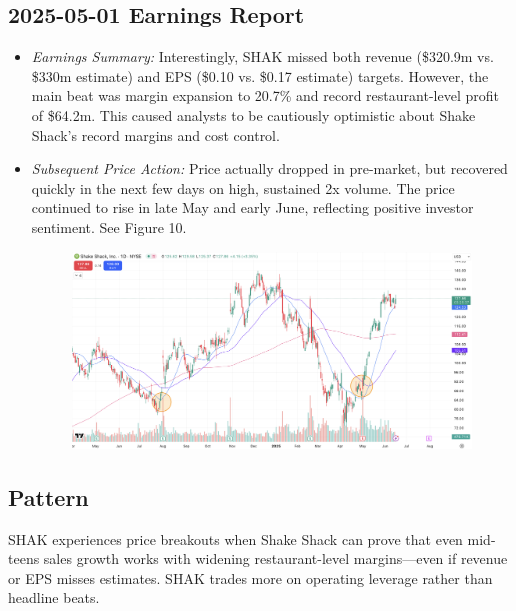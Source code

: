 \documentclass[11pt]{article}
\begin{document}
    \subsection{2025-05-01 Earnings Report}
        \begin{itemize}
            \item \textit{Earnings Summary:} Interestingly, SHAK missed both revenue (\$320.9m vs. \$330m estimate) and EPS (\$0.10 vs. \$0.17 estimate) targets. However, the main beat was margin expansion to 20.7\% and record restaurant-level profit of \$64.2m. This caused analysts to be cautiously optimistic about Shake Shack's record margins and cost control. 
            \item \textit{Subsequent Price Action:} Price actually dropped in pre-market, but recovered quickly in the next few days on high, sustained 2x volume. The price continued to rise in late May and early June, reflecting positive investor sentiment. See Figure 10.
            \begin{figure}[h]
                \centering \includegraphics[width=0.8\linewidth]{images/SHAK2.png}
                \caption{}
            \end{figure}
        \end{itemize}
    \subsection{Pattern}
        SHAK experiences price breakouts when Shake Shack can prove that even mid-teens sales growth works with widening restaurant-level margins---even if revenue or EPS misses estimates. SHAK trades more on operating leverage rather than headline beats.
\end{document}
